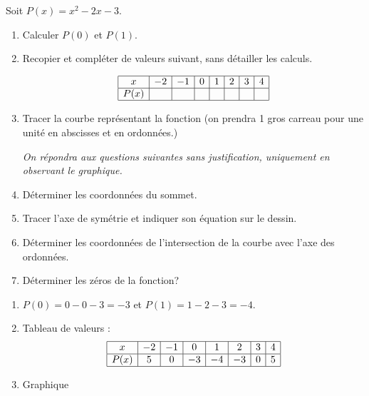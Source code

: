 



\begin{exo}
Soit $P(x)=x^2-2x-3$.

\begin{enumerate}
\item Calculer $P(0)$ et $P(1)$.
\item Recopier et compléter de valeurs suivant, sans détailler les calculs.

{
\setlength{\arraycolsep}{2mm}
$$
\begin{array}{|c|c|c|c|c|c|c|c|} \hline 
x & -2 & -1 & 0 & 1& 2 & 3 & 4  \\ \hline
P(x) & & & & & & &  \\ \hline
\end{array}
$$
}
\item Tracer la courbe représentant la fonction  (on prendra 1 gros carreau pour une unité en abscisses et en ordonnées.)

\smallskip
{\it On répondra aux questions suivantes sans justification, uniquement en observant le graphique.}
\smallskip

\item Déterminer les coordonnées du sommet.
\item Tracer l'axe de symétrie et indiquer son équation sur le dessin. 
\item Déterminer les coordonnées de l'intersection de la courbe avec l'axe des ordonnées.
\item Déterminer les zéros de la fonction?

\end{enumerate}

\begin{sol}
\begin{enumerate}
\item $P(0)=0-0-3=-3$ et $P(1)=1-2-3=-4$.
\item Tableau de valeurs : 
$$
\begin{array}{|c|c|c|c|c|c|c|c|} \hline 
x & -2 & -1 & 0 & 1& 2 & 3 & 4  \\ \hline
P(x) & 5  & 0 & -3 &  -4 & -3 & 0 & 5  \\ \hline
\end{array}
$$
\item Graphique 


\end{enumerate}
\end{sol}
\end{exo}
